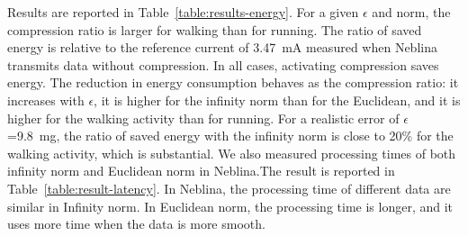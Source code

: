 \documentclass[10pt, conference, compsocconf]{IEEEtran}
\begin{document}
 Results are reported in Table~\ref{table:results-energy}. For a given
 $\epsilon$ and norm, the compression ratio is larger for walking than
 for running. The ratio of saved energy is relative to the reference
 current of 3.47~mA measured when Neblina transmits data without
 compression. In all cases, activating compression saves energy. The
 reduction in energy consumption behaves as the compression ratio: it
 increases with $\epsilon$,
it is higher for the infinity norm than for the Euclidean, and it is
higher for the walking activity than for running. For a realistic error
of $\epsilon$=9.8~mg, the ratio of saved energy with the infinity norm is
close to 20\% for the walking activity, which is substantial. We also
measured processing times of both infinity norm and Euclidean norm in
Neblina.The result is reported in Table~\ref{table:result-latency}.
In Neblina, the processing time of different data are similar in Infinity
norm. In Euclidean norm, the processing time is longer, and it uses more 
time when the data is more smooth.
\end{document}
